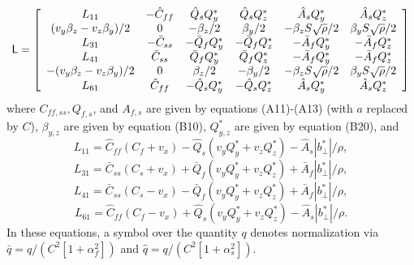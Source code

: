 \begin{equation}
{\sf L} = \left[ \begin{array}{cccccc}
L_{11} & -\hat{C}_{ff} & \hat{Q}_{s}Q_{y}^{\ast} & \hat{Q}_{s}Q_{z}^{\ast} & \hat{A}_{s}Q_{y}^{\ast} & \hat{A}_{s}Q_{z}^{\ast} \\
(v_{y}\beta_{z} - v_{z}\beta_{y})/2 & 0 & -\beta_{z}/2 & \beta_{y}/2 & -\beta_{z}S\sqrt{\rho}/2 & \beta_{y}S\sqrt{\rho}/2 \\
L_{31} & -\bar{C}_{ss} & -\bar{Q}_{f}Q_{y}^{\ast} & -\bar{Q}_{f}Q_{z}^{\ast} & -\bar{A}_{f}Q_{y}^{\ast} & -\bar{A}_{f}Q_{z}^{\ast} \\
L_{41} & \bar{C}_{ss} & \bar{Q}_{f}Q_{y}^{\ast} & \bar{Q}_{f}Q_{z}^{\ast} & -\bar{A}_{f}Q_{y}^{\ast} & -\bar{A}_{f}Q_{z}^{\ast} \\
-(v_{y}\beta_{z} - v_{z}\beta_{y})/2 & 0 & \beta_{z}/2 & -\beta_{y}/2 & -\beta_{z}S\sqrt{\rho}/2 & \beta_{y}S\sqrt{\rho}/2 \\
L_{61} & \hat{C}_{ff} & -\hat{Q}_{s}Q_{y}^{\ast} & -\hat{Q}_{s}Q_{z}^{\ast} & \hat{A}_{s}Q_{y}^{\ast} & \hat{A}_{s}Q_{z}^{\ast} \\
\end{array} \right]
\end{equation}
where $C_{ff,ss}, Q_{f,s}$, and $A_{f,s}$ are given by equations (A11)-(A13)
(with $a$ replaced by $C$), $\beta_{y,z}$ are given by equation (B10),
$Q_{y,z}^{\ast}$ are given by equation (B20), and
\begin{equation}
L_{11} = \hat{C}_{ff}(C_{f} + v_{x}) 
- \hat{Q}_{s}(v_{y}Q_{y}^{\ast} + v_{z}Q_{z}^{\ast})
- \hat{A}_{s}|b^{\ast}_{\perp}|/\rho,
\end{equation}
\begin{equation}
L_{31} = \bar{C}_{ss}(C_{s} + v_{x}) 
+ \bar{Q}_{f}(v_{y}Q_{y}^{\ast} + v_{z}Q_{z}^{\ast})
+ \bar{A}_{f}|b^{\ast}_{\perp}|/\rho,
\end{equation}
\begin{equation}
L_{41} = \bar{C}_{ss}(C_{s} - v_{x}) 
- \bar{Q}_{f}(v_{y}Q_{y}^{\ast} + v_{z}Q_{z}^{\ast})
+ \bar{A}_{f}|b^{\ast}_{\perp}|/\rho,
\end{equation}
\begin{equation}
L_{61} = \hat{C}_{ff}(C_{f} - v_{x}) 
+ \hat{Q}_{s}(v_{y}Q_{y}^{\ast} + v_{z}Q_{z}^{\ast})
- \hat{A}_{s}|b^{\ast}_{\perp}|/\rho.
\end{equation}
In these equations, a symbol over the quantity $q$ denotes normalization via
$\bar{q} = q/(C^{2}[1+\alpha_{f}^{2}])$ and
$\hat{q} = q/(C^{2}[1+\alpha_{s}^{2}])$.






